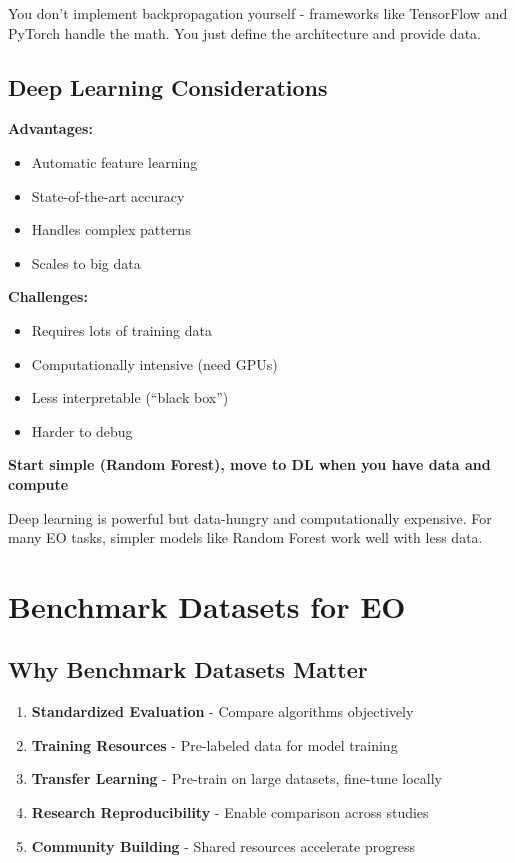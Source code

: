 \documentclass[
  letterpaper,
  DIV=11,
  numbers=noendperiod]{scrartcl}
\providecommand{\tightlist}{%
  \setlength{\itemsep}{0pt}\setlength{\parskip}{0pt}}
\begin{document}
You don't implement backpropagation yourself - frameworks like
TensorFlow and PyTorch handle the math. You just define the architecture
and provide data.

\subsection{Deep Learning
Considerations}\label{deep-learning-considerations}

\textbf{Advantages:}

\begin{itemize}
\tightlist
\item
  Automatic feature learning
\item
  State-of-the-art accuracy
\item
  Handles complex patterns
\item
  Scales to big data
\end{itemize}

\textbf{Challenges:}

\begin{itemize}
\tightlist
\item
  Requires lots of training data
\item
  Computationally intensive (need GPUs)
\item
  Less interpretable (``black box'')
\item
  Harder to debug
\end{itemize}

\textbf{Start simple (Random Forest), move to DL when you have data and
compute}

Deep learning is powerful but data-hungry and computationally expensive.
For many EO tasks, simpler models like Random Forest work well with less
data.

\section{Benchmark Datasets for EO}\label{benchmark-datasets-for-eo}

\subsection{Why Benchmark Datasets
Matter}\label{why-benchmark-datasets-matter}

\begin{enumerate}
\def\labelenumi{\arabic{enumi}.}
\tightlist
\item
  \textbf{Standardized Evaluation} - Compare algorithms objectively
\item
  \textbf{Training Resources} - Pre-labeled data for model training
\item
  \textbf{Transfer Learning} - Pre-train on large datasets, fine-tune
  locally
\item
  \textbf{Research Reproducibility} - Enable comparison across studies
\item
  \textbf{Community Building} - Shared resources accelerate progress
\end{enumerate}
\end{document}
